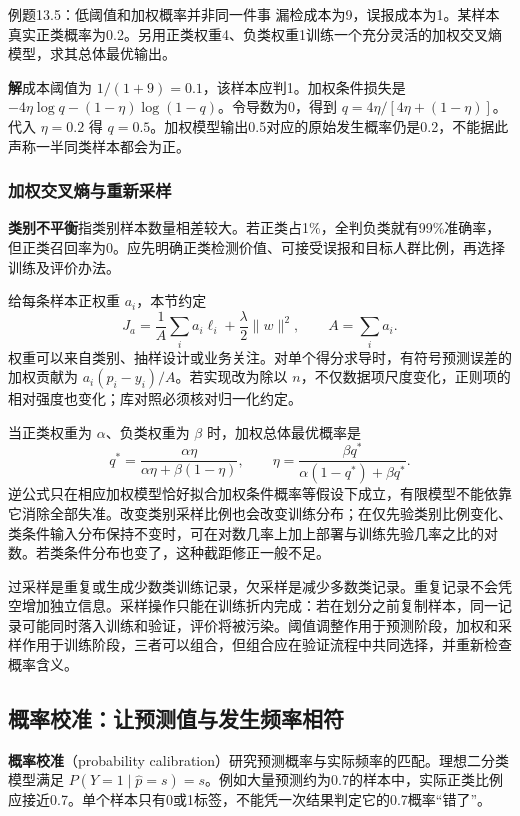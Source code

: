 \documentclass[UTF8,fontset=none,zihao=-4,a4paper]{ctexart}
\newcommand{\term}[1]{\textbf{#1}}
\newcommand{\sol}{\par\noindent\textbf{解}\quad}
\numberwithin{equation}{section}
\numberwithin{figure}{section}
\begin{document}
\begin{infobox}[unbreakable]{例题13.5：低阈值和加权概率并非同一件事}
漏检成本为9，误报成本为1。某样本真实正类概率为0.2。另用正类权重4、负类权重1训练一个充分灵活的加权交叉熵模型，求其总体最优输出。
\sol 成本阈值为 $1/(1+9)=0.1$，该样本应判1。加权条件损失是 $-4\eta\log q-(1-\eta)\log(1-q)$。令导数为0，得到 $q=4\eta/[4\eta+(1-\eta)]$。代入 $\eta=0.2$ 得 $q=0.5$。加权模型输出0.5对应的原始发生概率仍是0.2，不能据此声称一半同类样本都会为正。
\end{infobox}

\subsubsection{加权交叉熵与重新采样}
\term{类别不平衡}指类别样本数量相差较大。若正类占1\%，全判负类就有99\%准确率，但正类召回率为0。应先明确正类检测价值、可接受误报和目标人群比例，再选择训练及评价办法。

给每条样本正权重 $a_i$，本节约定
\[
 J_a=\frac{1}{A}\sum_i a_i\ell_i+\frac\lambda2\|w\|^2,
 \qquad A=\sum_i a_i.
\]
权重可以来自类别、抽样设计或业务关注。对单个得分求导时，有符号预测误差的加权贡献为 $a_i(p_i-y_i)/A$。若实现改为除以 $n$，不仅数据项尺度变化，正则项的相对强度也变化；库对照必须核对归一化约定。

当正类权重为 $\alpha$、负类权重为 $\beta$ 时，加权总体最优概率是
\[
 q^*=\frac{\alpha\eta}{\alpha\eta+\beta(1-\eta)},\qquad
 \eta=\frac{\beta q^*}{\alpha(1-q^*)+\beta q^*}.
\]
逆公式只在相应加权模型恰好拟合加权条件概率等假设下成立，有限模型不能依靠它消除全部失准。改变类别采样比例也会改变训练分布；在仅先验类别比例变化、类条件输入分布保持不变时，可在对数几率上加上部署与训练先验几率之比的对数。若类条件分布也变了，这种截距修正一般不足。

过采样是重复或生成少数类训练记录，欠采样是减少多数类记录。重复记录不会凭空增加独立信息。采样操作只能在训练折内完成：若在划分之前复制样本，同一记录可能同时落入训练和验证，评价将被污染。阈值调整作用于预测阶段，加权和采样作用于训练阶段，三者可以组合，但组合应在验证流程中共同选择，并重新检查概率含义。

\subsection{概率校准：让预测值与发生频率相符}
\term{概率校准}（probability calibration）研究预测概率与实际频率的匹配。理想二分类模型满足 $P(Y=1\mid\widehat p=s)=s$。例如大量预测约为0.7的样本中，实际正类比例应接近0.7。单个样本只有0或1标签，不能凭一次结果判定它的0.7概率“错了”。
\end{document}
